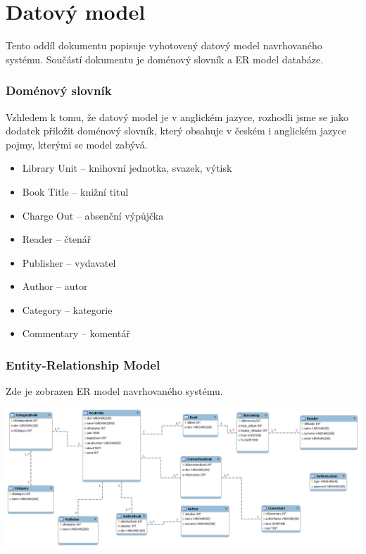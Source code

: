 \documentclass{article}
\begin{document}
\newpage

\part{Datový model}

\vspace{10mm}
\smallskip

\indent \par Tento oddíl dokumentu popisuje vyhotovený datový model navrhovaného
systému. Součástí dokumentu je doménový slovník a ER model databáze.

\newpage

\section{Doménový slovník}

Vzhledem k tomu, že datový model je v anglickém jazyce, rozhodli jsme se jako
dodatek přiložit doménový slovník, který obsahuje v českém i anglickém jazyce
pojmy, kterými se model zabývá.

\begin{itemize}

\item Library Unit -- knihovní jednotka, svazek, výtisk

\item Book Title -- knižní titul

\item Charge Out -- absenční výpůjčka

\item Reader -- čtenář

\item Publisher -- vydavatel

\item Author -- autor

\item Category -- kategorie

\item Commentary -- komentář

\end{itemize}

\newpage


\section{Entity-Relationship Model}

Zde je zobrazen ER model navrhovaného systému.

\bigskip
\includegraphics[width=450pt, angle=90]{img/ERM.png}

\newpage
\tableofcontents 
\end{document}
